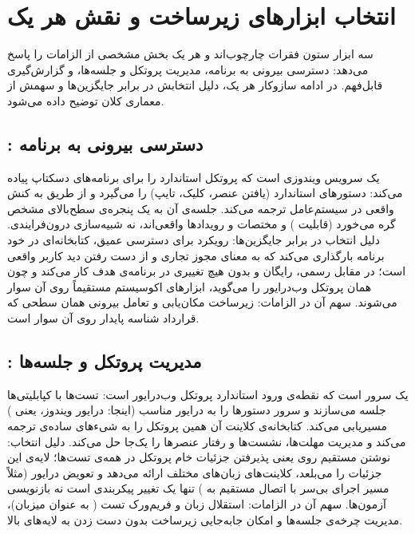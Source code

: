 \section{انتخاب ابزارهای زیرساخت و نقش هر یک}
سه ابزار ستون فقرات چارچوب‌اند و هر یک بخش مشخصی از الزامات را پاسخ می‌دهد: دسترسی بیرونی به برنامه، مدیریت پروتکل و جلسه‌ها، و گزارش‌گیری قابل‌فهم. در ادامه سازوکار هر یک، دلیل انتخابش در برابر جایگزین‌ها و سهمش از معماری کلان توضیح داده می‌شود.

\subsection{: دسترسی بیرونی به برنامه}
\cite{winappdriver}
یک سرویس ویندوزی است که پروتکل استاندارد
را برای برنامه‌های دسکتاپ پیاده می‌کند: دستورهای استاندارد (یافتن عنصر، کلیک، تایپ) را می‌گیرد و از طریق
\cite{uia}
به کنش واقعی در سیستم‌عامل ترجمه می‌کند. جلسه‌ی آن به یک پنجره‌ی سطح‌بالای مشخص گره می‌خورد (قابلیت
)
و مختصات و رویدادها واقعی‌اند، نه شبیه‌سازی درون‌فرایندی. دلیل انتخاب در برابر جایگزین‌ها: رویکرد
\cite{squish}
برای دسترسی عمیق، کتابخانه‌ای در خود برنامه بارگذاری می‌کند که به معنای مجوز تجاری و از دست رفتن دید کاربر واقعی است؛ در مقابل
رسمی، رایگان و بدون هیچ تغییری در برنامه‌ی هدف کار می‌کند و چون همان پروتکل وب‌درایور را می‌گوید، ابزارهای اکوسیستم
مستقیماً روی آن سوار می‌شوند. سهم آن در الزامات: زیرساخت مکان‌یابی و تعامل بیرونی  \pdash{}  همان سطحی که قرارداد شناسه پایدار روی آن سوار است.

\subsection{: مدیریت پروتکل و جلسه‌ها}
\cite{appium}
یک سرور
است که نقطه‌ی ورود استاندارد پروتکل وب‌درایور است: تست‌ها با کپابلیتی‌ها جلسه می‌سازند و سرور دستورها را به درایور مناسب (اینجا: درایور ویندوز، یعنی
)
مسیریابی می‌کند. کتابخانه‌ی کلاینت
آن همین پروتکل را به شیءهای ساده‌ی
ترجمه می‌کند و مدیریت مهلت‌ها، نشست‌ها و رفتار عنصرها را یک‌جا حل می‌کند. دلیل انتخاب: نوشتن مستقیم روی
یعنی پذیرفتن جزئیات خام پروتکل در همه‌ی تست‌ها؛ لایه‌ی
این جزئیات را می‌بلعد، کلاینت‌های زبان‌های مختلف ارائه می‌دهد و تعویض درایور (مثلاً مسیر اجرای بی‌سر با اتصال مستقیم به
)
تنها یک تغییر پیکربندی است نه بازنویسی آزمون‌ها. سهم آن در الزامات: استقلال زبان و فریم‌ورک تست (
به عنوان میزبان)، مدیریت چرخه‌ی جلسه‌ها و امکان جابه‌جایی زیرساخت بدون دست زدن به لایه‌های بالا.

